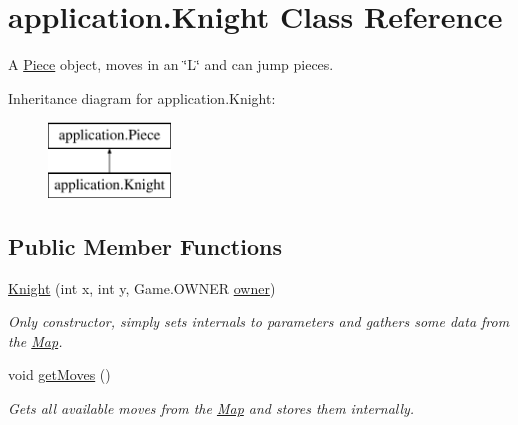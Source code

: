 \hypertarget{classapplication_1_1_knight}{\section{application.\+Knight Class Reference}
\label{classapplication_1_1_knight}
}


A \hyperlink{classapplication_1_1_piece}{Piece} object, moves in an \char`\"{}\+L\char`\"{} and can jump pieces.  


Inheritance diagram for application.\+Knight\+:\begin{figure}[H]
\begin{center}
\leavevmode
\includegraphics[height=2.000000cm]{classapplication_1_1_knight}
\end{center}
\end{figure}
\subsection*{Public Member Functions}
\begin{DoxyCompactItemize}
\item 
\hyperlink{classapplication_1_1_knight_a514487094841cbb827eea58b780f488e}{Knight} (int x, int y, Game.\+O\+W\+N\+E\+R \hyperlink{classapplication_1_1_piece_a724f116bd99a66a6f6bcc8b7b35de131}{owner})
\begin{DoxyCompactList}\small\item\em Only constructor, simply sets internals to parameters and gathers some data from the \hyperlink{classapplication_1_1_map}{Map}. \end{DoxyCompactList}\item 
\hypertarget{classapplication_1_1_knight_adf3b8759d81165000cf35274ba4e36b2}{void \hyperlink{classapplication_1_1_knight_adf3b8759d81165000cf35274ba4e36b2}{get\+Moves} ()}\label{classapplication_1_1_knight_adf3b8759d81165000cf35274ba4e36b2}

\begin{DoxyCompactList}\small\item\em Gets all available moves from the \hyperlink{classapplication_1_1_map}{Map} and stores them internally. \end{DoxyCompactList}\end{DoxyCompactItemize}
